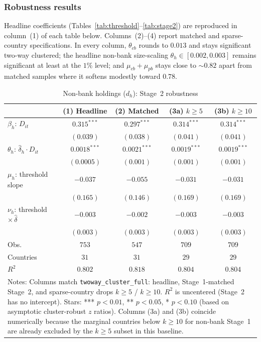 \documentclass[\latexroot/\projectname]{subfiles}
\begin{document}
\subsubsection{Robustness results}
\whenintegrated{\label{app:robustness-results}}

Headline coefficients (Tables~\ref{tab:threshold}--\ref{tab:stage2}) are reproduced in column~(1) of each table below. Columns~(2)--(4) report matched and sparse-country specifications. In every column, $\theta_{cb}$ rounds to $0.013$ and stays significant two-way clustered; the headline non-bank size-scaling $\theta_h\in[0{.}002,0{.}003]$ remains significant at least at the $1\%$ level; and $\mu_{cb}+\mu_{pb}$ stays close to $\sim\!0{.}82$ apart from matched samples where it softens modestly toward $0{.}78$.

\begin{table}[htbp]\centering
\caption{Non-bank holdings ($d_h$): Stage~2 robustness}
\label{tab:app-nonbank}
\setlength{\tabcolsep}{6pt}
\renewcommand{\arraystretch}{1.15}
\begin{tabular}{lcccc}
\toprule
 & (1) Headline & (2) Matched & (3a) $k\!\ge\!5$ & (3b) $k\!\ge\!10$ \\
\midrule
$\beta_h$: $D_{it}$
  & $0.315^{***}$ & $0.297^{***}$ & $0.314^{***}$ & $0.314^{***}$ \\
  & $(0.039)$ & $(0.038)$ & $(0.041)$ & $(0.041)$ \\
$\theta_h$: $\hat\delta_h\!\cdot D_{it}$
  & $0.0018^{***}$ & $0.0021^{***}$ & $0.0019^{***}$ & $0.0019^{***}$ \\
  & $(0.0005)$ & $(0.001)$ & $(0.001)$ & $(0.001)$ \\
$\mu_h$: threshold slope
  & $-0.037$ & $-0.055$ & $-0.031$ & $-0.031$ \\
  & $(0.165)$ & $(0.146)$ & $(0.169)$ & $(0.169)$ \\
$\nu_h$: threshold $\times\,\hat\delta$
  & $-0.003$ & $-0.002$ & $-0.003$ & $-0.003$ \\
  & $(0.003)$ & $(0.003)$ & $(0.003)$ & $(0.003)$ \\
\midrule
Obs.        & $753$ & $547$ & $709$ & $709$ \\
Countries   & $31$ & $31$ & $29$ & $29$ \\
$R^2$       & $0.802$ & $0.818$ & $0.804$ & $0.804$ \\
\bottomrule
\multicolumn{5}{p{0.9\linewidth}}{\footnotesize Notes: Columns match \texttt{twoway\_cluster\_full}: headline, Stage~1-matched Stage~2, and sparse-country drops $k\ge5$ / $k\ge10$. $R^2$ is uncentered (Stage~2 has no intercept). Stars: *** $p<0.01$, ** $p<0.05$, * $p<0.10$ (based on asymptotic cluster-robust $z$ ratios). Columns (3a) and (3b) coincide numerically because the marginal countries below $k\ge10$ for non-bank Stage~1 are already excluded by the $k\ge5$ subset in this baseline.}
\end{tabular}
\end{table}
\end{document}
